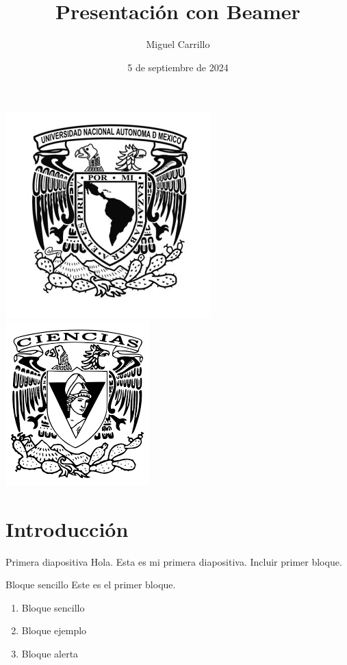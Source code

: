 \documentclass[aspectratio=169]{beamer}
\title{Presentación con Beamer}
\author{Miguel Carrillo }
\date{5 de septiembre de 2024}
\begin{document}
\begin{frame}[plain]
\titlepage
\begin{center}
	\includegraphics[scale=0.2]{imagenes/logo_unam.jpg}\hspace{8cm}
	\includegraphics[scale=0.04]{imagenes/ciencias.png}  
\end{center}

\end{frame}


\section{Introducción}
\begin{frame}{Primera diapositiva}
    Hola. Esta es mi primera diapositiva. Incluir primer bloque. \pause

    \begin{block}{Bloque sencillo}  
        Este es el primer bloque. \pause
        \begin{enumerate}
            \item Bloque sencillo \pause
            \item Bloque ejemplo \pause
            \item Bloque alerta
        \end{enumerate}
    \end{block}
\end{frame}
\end{document}
